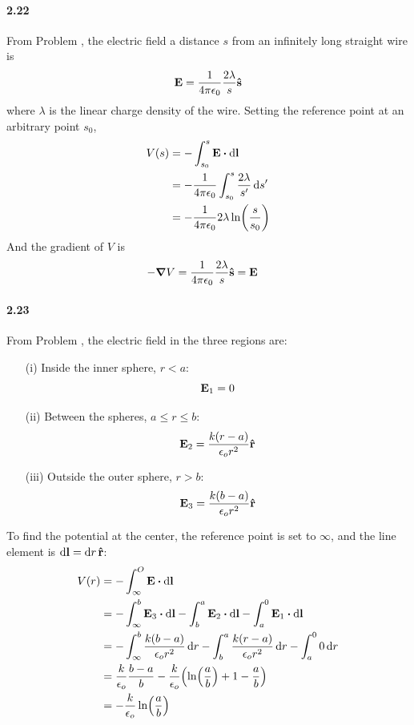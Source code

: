 \documentclass[../main.tex]{subfiles}
\begin{document}
\paragraph{2.22}
From Problem , the electric field a distance $s$ from an infinitely long straight
wire is
\[ \vb{E} = \frac{1}{4\pi\epsilon_0} \frac{2\lambda}{s} \vu{s} \]
where $\lambda$ is the linear charge density of the wire. Setting the reference point at an
arbitrary point $s_0$,
\begin{align*}
    V(s) &= - \int_{s_0}^s \vb{E} \vdot \dd{\vb{l}} \\
    &= - \ke \int_{s_0}^s \frac{2\lambda}{s'} \dd{s'} \\
    &= - \ke 2\lambda \ln(\frac{s}{s_0})
\end{align*}
And the gradient of $V$ is
\begin{align*}
    -\grad V &= \frac{1}{4\pi\epsilon_0} \frac{2\lambda}{s} \vu{s} = \vb{E}
\end{align*}

\paragraph{2.23}
From Problem , the electric field in the three regions are:
\begin{enumerate}
    \item[(i)] Inside the inner sphere, $r < a$:
    \[ \vb{E}_1 = 0 \]
    \item[(ii)] Between the spheres, $a \leq r \leq b$:
    \[ \vb{E}_2 = \frac{k(r - a)}{\epsilon_o r^2} \vu{r} \]
    \item[(iii)] Outside the outer sphere, $r > b$:
    \[ \vb{E}_3 = \frac{k(b - a)}{\epsilon_o r^2} \vu{r} \]
\end{enumerate}
To find the potential at the center, the reference point is set to $\infty$, and the line element is
$\dd{\vb{l}} = \dd{r} \vu{r}$:
\begin{align*}
    V(r) &= - \int_\infty^O \vb{E} \vdot \dd{\vb{l}} \\
    &= - \int_\infty^b \vb{E}_3 \vdot \dd{\vb{l}} - \int_b^a \vb{E}_2 \vdot \dd{\vb{l}}
        - \int_a^0 \vb{E}_1 \vdot \dd{\vb{l}} \\
    &= - \int_\infty^b \frac{k(b - a)}{\epsilon_o r^2} \dd{r}
        - \int_b^a \frac{k(r - a)}{\epsilon_o r^2} \dd{r} - \int_a^0 0 \dd{r} \\
    &= \frac{k}{\epsilon_o} \frac{b - a}{b}
        - \frac{k}{\epsilon_o} \qt(\ln(\frac{a}{b}) + 1 - \frac{a}{b}) \\
    &= - \frac{k}{\epsilon_o} \ln(\frac{a}{b})
\end{align*}
\end{document}
